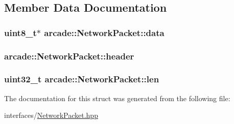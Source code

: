 \subsection{Member Data Documentation}
\hypertarget{structarcade_1_1_network_packet_afb76a6c53bfe65517bd668d4e87d77a3}{
\subsubsection[{data}]{\setlength{\rightskip}{0pt plus 5cm}uint8\-\_\-t$\ast$ arcade\-::\-Network\-Packet\-::data}}\label{structarcade_1_1_network_packet_afb76a6c53bfe65517bd668d4e87d77a3}
\hypertarget{structarcade_1_1_network_packet_ad857cd0a4f6387035f4f954ca6d33676}{
\subsubsection[{header}]{ arcade\-::\-Network\-Packet\-::header}}\label{structarcade_1_1_network_packet_ad857cd0a4f6387035f4f954ca6d33676}
\hypertarget{structarcade_1_1_network_packet_a1f6c07b81a4e7a276d933f326baae6fa}{
\subsubsection[{len}]{\setlength{\rightskip}{0pt plus 5cm}uint32\-\_\-t arcade\-::\-Network\-Packet\-::len}}\label{structarcade_1_1_network_packet_a1f6c07b81a4e7a276d933f326baae6fa}


The documentation for this struct was generated from the following file\-:\begin{DoxyCompactItemize}
\item 
interfaces/\hyperlink{_network_packet_8hpp}{Network\-Packet.\-hpp}\end{DoxyCompactItemize}
